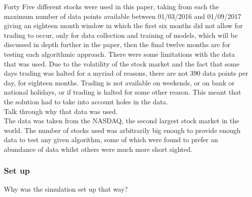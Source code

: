 \documentclass[12pt,a4paper]{article}
\begin{document}
Forty Five different stocks were used in this paper, taking from each the maximum number of data points available between 01/03/2016 and 01/09/2017 giving an eighteen month window in which the first six months did not allow for trading to occur, only for data collection and training of models, which will be discussed in depth further in the paper, then the final twelve months are for testing each algorithmic approach. There were some limitations with the data that was used. Due to the volatility of the stock market and the fact that some days trading was halted for a myriad of reasons, there are not 390 data points per day, for eighteen months. Trading is not available on weekends, or on bank or national holidays, or if trading is halted for some other reason. This meant that the solution had to take into account holes in the data.\\


Talk through why that data was used.\\

The data was taken from the NASDAQ, the second largest stock market in the world. The number of stocks used was arbitrarily big enough to provide enough data to test any given algorithm, some of which were found to prefer an abundance of data whilst others were much more short sighted. \\

\subsubsection*{Set up}

Why was the simulation set up that way?\\
\end{document}
